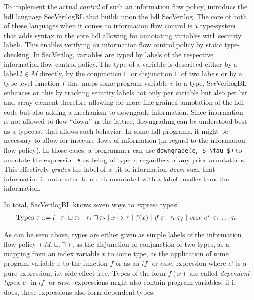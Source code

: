 To implement the actual \textit{control} of such an information flow policy, \citeauthor{Ferraiuolo17} introduce the \gls{hdl} language SecVerilogBL that builds upon the \gls{hdl} SecVerilog.
The core of both of these languages when it comes to information flow control is a type-system that adds syntax to the core \gls{hdl} allowing for annotating variables with security labels.
This enables verifying an information flow control policy by static type-checking.
In SecVerilog, variables are typed by labels of the respective information flow control policy.
The type of a variable is described either by a label $ l \in M $ directly, by the conjunction $ \sqcap $ or disjunction $ \sqcup $ of two labels or by a type-level function $ f $ that maps some program variable $ v $ to a type.
SecVerilogBL enhances on this by tracking security labels not only per variable but also per bit and array element therefore allowing for more fine grained annotation of the \gls{hdl} code but also adding a mechanism to downgrade information.
Since information is not allowed to flow \enquote{down} in the lattice, downgrading can be understood best as a typecast that allows such behavior.
In some \gls{hdl} programs, it might be necessary to allow for insecure flows of information (in regard to the information flow policy).
In those cases, a programmer can use \lstinline[mathescape]{downgrade(e, $ \tau $)} to annotate the expression \lstinline{e} as being of type $ \tau $, regardless of any prior annotations.
This effectively \textit{grades} the label of a bit of information \textit{down} such that information is not routed to a sink annotated with a label smaller than the information.

In total, SecVerilogBL knows seven ways to express types:
\begin{align*}
    \text{Types } \tau ::= l \mid \tau_1 \sqcup \tau_2 \mid \tau_1 \sqcap \tau_2 \mid x \mapsto \tau \mid f(x) \mid \textit{if $ e^\tau $ $ \tau_t $ $ \tau_f $} \mid \textit{case $ e^\tau $ $ \tau_1 $ \dots $ \tau_n $}
\end{align*}

As can be seen above, types are either given as simple labels of the information flow policy $ (M, \sqcup, \sqcap) $, as the disjunction or conjunction of two types, as a mapping from an index variable $ x $ to some type, as the application of some program variable $ x $ to the function $ f $ or as an $ \textit{if} $- or $ \textit{case} $-expression where $ e^\tau $ is a pure-expression, i.e. side-effect free.
Types of the form $ f(x) $ are called \textit{dependent types}.
$ e^\tau $ in $ \textit{if} $- or $ \textit{case} $- expressions might also contain program variables; if it does, these expressions also form dependent types.

